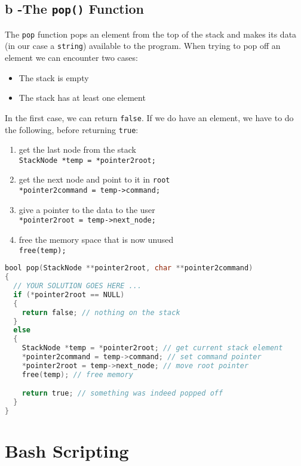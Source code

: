 \documentclass[a4paper, 11pt]{article}
\begin{document}
    \subsection{b -The \texttt{pop()} Function}
    The \texttt{pop} function pops an element from the top of the stack and makes its data (in our case a \texttt{string}) 
    available to the program. When trying to pop off an element we can encounter two cases:
    \begin{itemize}
      \item The stack is empty
      \item The stack has at least one element
    \end{itemize}
    In the first case, we can return \lstinline{false}. If we do have an element, we have to do the following, 
    before returning \lstinline{true}:
    \begin{enumerate}
      \item get the last node from the stack \\
            \lstinline{StackNode *temp = *pointer2root;}
      \item get the next node and point to it in \texttt{root} \\
            \lstinline{*pointer2command = temp->command;}
      \item give a pointer to the data to the user \\
            \lstinline{*pointer2root = temp->next_node;}
      \item free the memory space that is now unused \\
            \lstinline{free(temp);}
    \end{enumerate}
    \begin{lstlisting}[language=C,caption={The \texttt{pop()} Function},label={pop}]
bool pop(StackNode **pointer2root, char **pointer2command)
{
  // YOUR SOLUTION GOES HERE ...
  if (*pointer2root == NULL)
  {
    return false; // nothing on the stack
  }
  else
  {
    StackNode *temp = *pointer2root; // get current stack element
    *pointer2command = temp->command; // set command pointer
    *pointer2root = temp->next_node; // move root pointer
    free(temp); // free memory

    return true; // something was indeed popped off
  }
}
    \end{lstlisting}
    \newpage

    \section{Bash Scripting}
\end{document}
